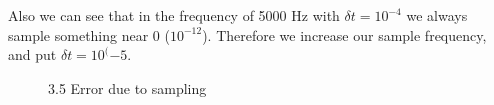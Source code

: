 \documentclass[]{report}
\begin{document}
Also we can see that in the frequency of 5000 Hz with $\delta t=10^{-4}$ we always sample something near 0 ($10^{-12}$). Therefore we increase our sample frequency,  and put $\delta t=10^({-5}$.
\begin{figure}[h!]
	\hfill
	\caption*{3.5  Error due to sampling}
\end{figure}
\end{document}
